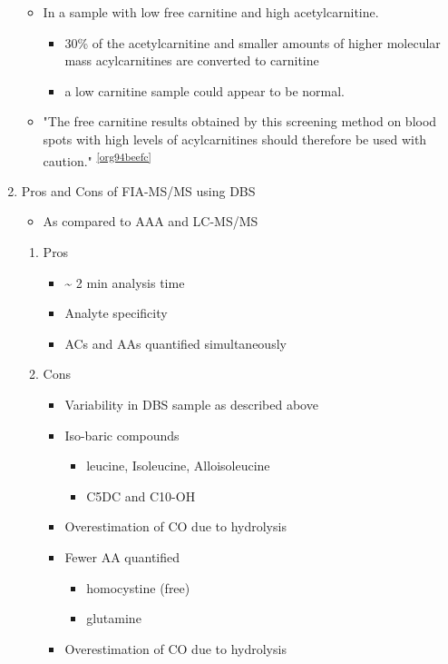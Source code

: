 \documentclass{scrartcl}
\begin{document}
\begin{enumerate}
\begin{itemize}
\item In a sample with low free carnitine and high acetylcarnitine.
\begin{itemize}
\item 30\% of the acetylcarnitine and smaller amounts of higher
molecular mass acylcarnitines are converted to carnitine
\item a low carnitine sample could appear to be normal.
\end{itemize}
\item "The free carnitine results obtained by this screening method on
blood spots with high levels of acylcarnitines should therefore be
used with caution." \textsuperscript{\ref{org94beefc}}
\end{itemize}

\item Pros and Cons of FIA-MS/MS using DBS
\label{sec:org477beb8}
\begin{itemize}
\item As compared to AAA and LC-MS/MS
\end{itemize}
\begin{enumerate}
\item Pros
\label{sec:org116682e}
\begin{itemize}
\item \textasciitilde{} 2 min analysis time
\item Analyte specificity
\item ACs and AAs quantified simultaneously
\end{itemize}

\item Cons
\label{sec:org4e44022}
\begin{itemize}
\item Variability in DBS sample as described above
\item Iso-baric compounds
\begin{itemize}
\item leucine, Isoleucine, Alloisoleucine
\item C5DC and C10-OH
\end{itemize}
\item Overestimation of CO due to hydrolysis
\item Fewer AA quantified
\begin{itemize}
\item homocystine (free)
\item glutamine
\end{itemize}
\item Overestimation of CO due to hydrolysis
\end{itemize}
\end{enumerate}
\end{enumerate}
\end{document}

